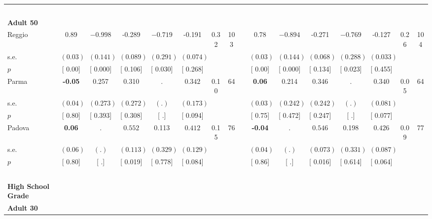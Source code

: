 \begin{longtable}{L{8em} c c c c c c c p{1em} c c c c c c c}
~\\[1em]
\quad \quad \textbf{Adult 50} & & & & & & & & & & & & & & & \\* 
\quad \quad \quad Reggio& 0.89 & $ \mathbf{   -0.998}$ &    -0.289 & $ \mathbf{   -0.719}$ &    -0.191 &      0.32 &       103 & & 0.78 & $ \mathbf{   -0.894}$ &    -0.271 & $ \mathbf{   -0.769}$ &    -0.127 &      0.26 &       104  \\*
\quad \quad \quad \quad s.e.& $ (     0.03)$ & $ (    0.141)$ & $ (    0.089)$ & $ (    0.291)$ & $ (    0.074)$ & & & & $ (     0.03)$ & $ (    0.144)$ & $ (    0.068)$ & $ (    0.288)$ & $ (    0.033)$ & &  \\*
\quad \quad \quad \quad $ p$ & [     0.00] & [    0.000] & [    0.106] & [    0.030] & [    0.268] & & & & [     0.00] & [    0.000] & [    0.134] & [    0.023] & [    0.455] & &  \\[1em]
\quad \quad \quad Parma& \textbf{    -0.05} &     0.257 &     0.310 &         . & $ \mathbf{    0.342}$ &      0.10 &        64 & & \textbf{     0.06} &     0.214 &     0.346 &         . & $ \mathbf{    0.340}$ &      0.05 &        64  \\*
\quad \quad \quad \quad s.e.& $ (     0.04)$ & $ (    0.273)$ & $ (    0.272)$ & $ (        .)$ & $ (    0.173)$ & & & & $ (     0.03)$ & $ (    0.242)$ & $ (    0.242)$ & $ (        .)$ & $ (    0.081)$ & &  \\*
\quad \quad \quad \quad $ p$ & [     0.80] & [    0.393] & [    0.308] & [        .] & [    0.094] & & & & [     0.75] & [    0.472] & [    0.247] & [        .] & [    0.077] & &  \\[1em]
\quad \quad \quad Padova& \textbf{     0.06} &         . & $ \mathbf{    0.552}$ &     0.113 & $ \mathbf{    0.412}$ &      0.15 &        76 & & \textbf{    -0.04} &         . & $ \mathbf{    0.546}$ &     0.198 & $ \mathbf{    0.426}$ &      0.09 &        77  \\*
\quad \quad \quad \quad s.e.& $ (     0.06)$ & $ (        .)$ & $ (    0.113)$ & $ (    0.329)$ & $ (    0.129)$ & & & & $ (     0.04)$ & $ (        .)$ & $ (    0.073)$ & $ (    0.331)$ & $ (    0.087)$ & &  \\*
\quad \quad \quad \quad $ p$ & [     0.80] & [        .] & [    0.019] & [    0.778] & [    0.084] & & & & [     0.86] & [        .] & [    0.016] & [    0.614] & [    0.064] & &  \\[1em]
~\\[1em]
\textbf{High School Grade} \\*
\quad \quad \textbf{Adult 30} & & & & & & & & & & & & & & & \\* 

\end{longtable}
